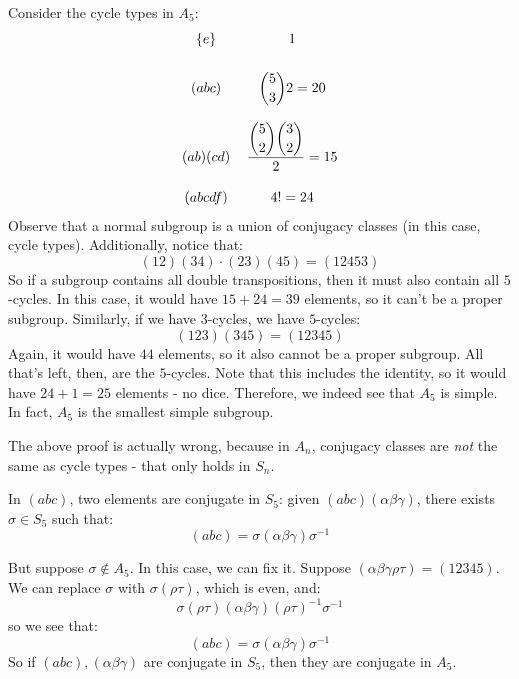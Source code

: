 \begin{pf}[source=Primary Source Material]
    Consider the cycle types in $ A_{5} $:
    \begin{equation*}
        \begin{tabular}{cc}
            $ \set{e} $ & $ 1 $ \vsp \ \\
            $ (abc) $ & $ \dbinom 5 3 2 = 20 $ \vsp \ \\
            $ (ab)(cd) $ & $ \dfrac{\dbinom 5 2 \dbinom 3 2}{2} = 15 $ \vsp \ \\
            $ (abcdf) $ & $ 4! = 24 $
        \end{tabular}
    \end{equation*}
    Observe that a normal subgroup is a union of conjugacy classes (in this case, cycle types).
    Additionally, notice that:
    \begin{equation*}
        (12)(34) \cdot (23)(45) = (12453)
    \end{equation*}
    So if a subgroup contains all double transpositions,
    then it must also contain all $ 5 $-cycles.
    In this case, it would have $ 15 + 24 = 39 $ elements, so it can't be a proper subgroup. \vsp
    Similarly, if we have $ 3 $-cycles, we have $ 5 $-cycles:
    \begin{equation*}
        (123)(345) = (12345)
    \end{equation*}
    Again, it would have $ 44 $ elements, so it also cannot be a proper subgroup. \vsp
    All that's left, then, are the $ 5 $-cycles. Note that this includes the identity, so it would
    have $ 24 + 1 = 25 $ elements - no dice. \vsp
    Therefore, we indeed see that $ A_{5} $ is simple.
    In fact, $ A_{5} $ is the smallest simple subgroup.
\end{pf}
The above proof is actually wrong, because in $ A_{n} $, conjugacy classes are \textit{not} the
same as cycle types - that only holds in $ S_{n} $.

In $ (abc) $, two elements are conjugate in $ S_{5} $: given $ (abc)(\alpha\beta\gamma) $,
there exists $ \sigma \in S_{5} $ such that:
\begin{equation*}
    (abc) = \sigma(\alpha\beta\gamma)\sigma^{-1}
\end{equation*}

But suppose $ \sigma \notin A_{5} $.
In this case, we can fix it.
Suppose $ (\alpha\beta\gamma\rho\tau) = (12345) $.
We can replace $ \sigma $ with $ \sigma(\rho\tau) $, which is even, and:
\begin{equation*}
    \sigma(\rho\tau)(\alpha\beta\gamma)(\rho\tau)^{-1}\sigma^{-1}
\end{equation*}
so we see that:
\begin{equation*}
    (abc) = \sigma(\alpha\beta\gamma)\sigma^{-1}
\end{equation*}
So if $ (abc), (\alpha\beta\gamma) $ are conjugate in $ S_{5} $,
then they are conjugate in $ A_{5} $.

